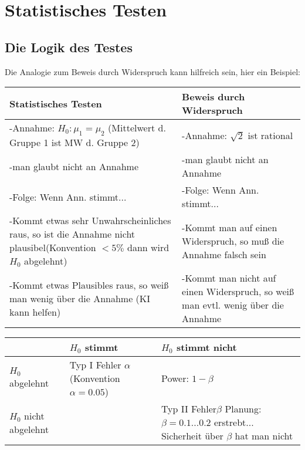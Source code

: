 \chapter{Statistisches Testen}
\section{Die Logik des Testes}
Die Analogie zum Beweis durch Widerspruch kann hilfreich sein, hier ein Beispiel:\\
\begin{tabularx}{\linewidth}{|L|L|}  
	\hline
	Statistisches Testen & Beweis durch Widerspruch \\ \hline
	-Annahme: $H_0: \mu_1 = \mu_2$ (Mittelwert d. Gruppe 1 ist MW d. Gruppe 2)  & -Annahme: $\sqrt{2}$ ist rational \\
	-man glaubt nicht an Annahme & -man glaubt nicht an Annahme \\
	-Folge: Wenn Ann. stimmt... & -Folge: Wenn Ann. stimmt... \\
	-Kommt etwas sehr Unwahrscheinliches raus, so ist die Annahme nicht plausibel(Konvention $< 5\%$ dann wird $H_0$ abgelehnt) & -Kommt man auf einen Widerspruch, so muß die Annahme falsch sein \\
	-Kommt etwas Plausibles raus, so weiß man wenig über die Annahme (KI kann helfen) & -Kommt man nicht auf einen Widerspruch, so weiß man evtl. wenig über die Annahme \\ \hline
\end{tabularx}
\begin{tabularx}{\linewidth}{|L|L|L|}
	\hline
	& $H_0$ stimmt & $H_0$ stimmt nicht \\ \hline
	$H_0$ abgelehnt & Typ I Fehler \newline $\alpha$ \newline (Konvention $\alpha = 0.05$) & \dSmiley \newline Power: $1-\beta$ \\ \hline
	$H_0$ nicht abgelehnt & \dSmiley & Typ II Fehler\newline $\beta$ \newline Planung: $\beta=0.1 ... 0.2$ erstrebt... \newline Sicherheit über $\beta$ hat man nicht \\ \hline
\end{tabularx}

